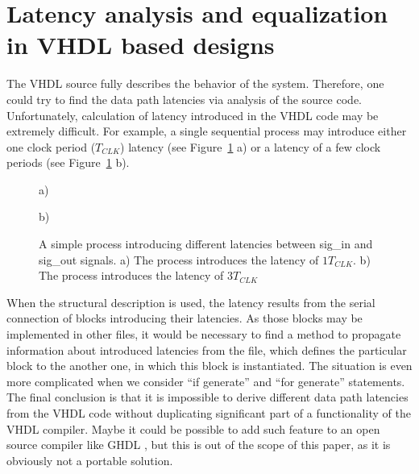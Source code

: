 \documentclass[preprint,11pt]{elsarticle}
\newcommand{\wzcite}[1]{ \cite{#1}}
\begin{document}
 \section{Latency analysis and equalization in VHDL based designs}
 The VHDL source fully describes the behavior of the system. Therefore, one could
 try to find the data path latencies via analysis of the source code.
 Unfortunately, calculation of latency introduced in the VHDL code may be extremely difficult.
 For example, a single sequential process may introduce either one clock period
($T_{CLK}$) latency (see Figure~\ref{fig:hdl-latencies-1} a) or a latency of a few clock
    periods (see Figure~\ref{fig:hdl-latencies-1} b).
\begin{figure}
 \begin{minipage}{\linewidth}
 {
\scriptsize
\begin{multicols}{2}
	\small
    a)\\
	\scriptsize
	
	\vfill
	\columnbreak
\small
    b)\\
	\scriptsize
	
 \end{multicols}
 }
 \end{minipage}
 \vspace{3mm}
 \caption{\label{fig:hdl-latencies-1}
 A simple process introducing different latencies between sig\_in and sig\_out signals. 
 a) The process introduces the latency of $1 T_{CLK}$. b) The process introduces the latency of  $3 T_{CLK}$ 
 }
\end{figure}    
When the structural description is used, the latency results from the serial connection
of blocks introducing their latencies. As those blocks may be implemented in other files,
it would be necessary to find a method to propagate information about introduced latencies
from the file, which defines the particular block to the another one, in which this block
is instantiated. 
The situation is even more complicated when we consider ``if generate'' and ``for generate'' 
statements.
The final conclusion is that it is impossible to derive different data path latencies
from the VHDL code without duplicating significant part of a functionality of the VHDL 
compiler. Maybe it could be possible to add such feature to an open source compiler
like GHDL\wzcite{url-ghdl}, but this is out of the scope of this paper, as it is obviously not
a portable solution.
\end{document}
